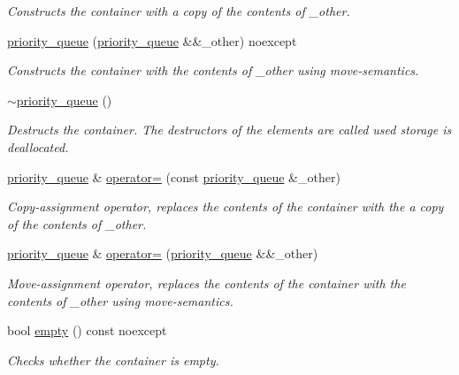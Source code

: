 \begin{DoxyCompactItemize}
\begin{DoxyCompactList}\small\item\em Constructs the container with a copy of the contents of {\ttfamily \+\_\+other}. \end{DoxyCompactList}\item 
\hyperlink{classcrsc_1_1priority__queue_abcb59ed0013620d12e7b5d737df76529}{priority\+\_\+queue} (\hyperlink{classcrsc_1_1priority__queue}{priority\+\_\+queue} \&\&\+\_\+other) noexcept
\begin{DoxyCompactList}\small\item\em Constructs the container with the contents of {\ttfamily \+\_\+other} using move-\/semantics. \end{DoxyCompactList}\item 
\hyperlink{classcrsc_1_1priority__queue_a83a4b61c8ce19b7690e8d9b7828cc9c2}{$\sim$priority\+\_\+queue} ()
\begin{DoxyCompactList}\small\item\em Destructs the container. The destructors of the elements are called used storage is deallocated. \end{DoxyCompactList}\item 
\hyperlink{classcrsc_1_1priority__queue}{priority\+\_\+queue} \& \hyperlink{classcrsc_1_1priority__queue_aa514b407798f48c5f5f2cd21256997a7}{operator=} (const \hyperlink{classcrsc_1_1priority__queue}{priority\+\_\+queue} \&\+\_\+other)
\begin{DoxyCompactList}\small\item\em Copy-\/assignment operator, replaces the contents of the container with the a copy of the contents of {\ttfamily \+\_\+other}. \end{DoxyCompactList}\item 
\hyperlink{classcrsc_1_1priority__queue}{priority\+\_\+queue} \& \hyperlink{classcrsc_1_1priority__queue_a7a9bc10de10f479718c05a1f6df55cf1}{operator=} (\hyperlink{classcrsc_1_1priority__queue}{priority\+\_\+queue} \&\&\+\_\+other)
\begin{DoxyCompactList}\small\item\em Move-\/assignment operator, replaces the contents of the container with the contents of {\ttfamily \+\_\+other} using move-\/semantics. \end{DoxyCompactList}\item 
bool \hyperlink{classcrsc_1_1priority__queue_acc3ad538699e923b4ee50bd30c6379f6}{empty} () const  noexcept
\begin{DoxyCompactList}\small\item\em Checks whether the container is empty. \end{DoxyCompactList}\item 

\end{DoxyCompactItemize}
